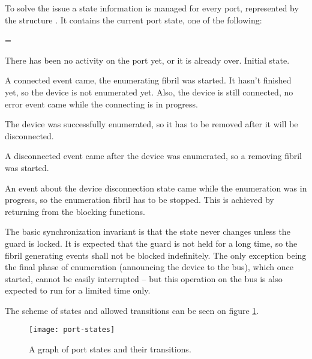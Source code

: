 To solve the issue a state information is managed for every port, represented
by the structure . It contains the current port state, one
of the following:

\begin{description}
\begingroup \leftskip=1cm \rightskip=\leftskip
\setcounter{enumi}{-1}
	\item[\state{Disabled}]
		There has been no activity on the port yet, or it is already over.
		Initial state.

	\item[\state{Connecting}]
		A connected event came, the enumerating fibril was started. It hasn't
		finished yet, so the device is not enumerated yet. Also, the device is
		still connected, no error event came while the connecting is in
		progress.

	\item[\state{Enumerated}]
		The device was successfully enumerated, so it has to be removed after
		it will be disconnected.

	\item[\state{Disconnecting}]
		A disconnected event came after the device was enumerated, so
		a removing fibril was started.

	\item[\state{Error}]
		An event about the device disconnection state came while the
		enumeration was in progress, so the enumeration fibril has to be
		stopped. This is achieved by returning  from the blocking
		functions.

\endgroup
\end{description}

The basic synchronization invariant is that the state never changes unless the
guard is locked. It is expected that the guard is not held for a long time, so
the fibril generating events shall not be blocked indefinitely. The only
exception being the final phase of enumeration (announcing the device to the
bus), which once started, cannot be easily interrupted -- but this operation on
the bus is also expected to run for a limited time only.

The scheme of states and allowed transitions can be seen on figure
\ref{fig:port-states}.

\begin{figure}[h]
	\centering
	\texttt{[image: port-states]}
	\caption{A graph of port states and their transitions.}
	\label{fig:port-states}
\end{figure}

